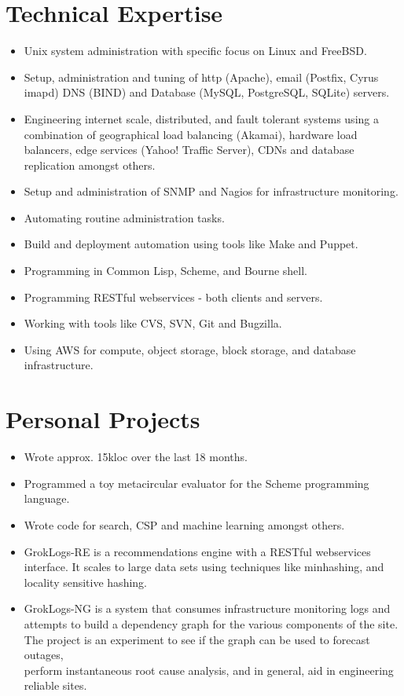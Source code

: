 \documentclass[margin]{res}
\begin{document}
\begin{resume}
\section{Technical Expertise} 
 \begin{itemize} \itemsep -2pt
 \item Unix system administration with specific focus on Linux and FreeBSD.
 \item Setup, administration and tuning of http (Apache), email (Postfix, Cyrus imapd)
   DNS (BIND) and Database (MySQL, PostgreSQL, SQLite) servers.
 \item Engineering internet scale, distributed, and fault tolerant systems 
   using a \\ combination of geographical load balancing (Akamai), hardware load 
   balancers, edge services (Yahoo! Traffic Server), CDNs  and database replication 
   amongst others.
 \item Setup and administration of SNMP and Nagios for infrastructure monitoring.
 \item Automating routine administration tasks.
 \item Build and deployment automation using tools like Make and Puppet.
 \item Programming in Common Lisp, Scheme, and Bourne shell.
 \item Programming RESTful webservices - both clients and servers.
 \item Working with tools like CVS, SVN, Git and Bugzilla.
 \item Using AWS for compute, object storage, block storage, and database \\ 
   infrastructure.

 \end{itemize}

\section{Personal Projects} 
 \begin{itemize} \itemsep -2pt
 \item Wrote approx. 15kloc over the last 18 months.
 \item Programmed a toy metacircular evaluator for the Scheme programming
   language.
 \item Wrote code for search, CSP and machine learning amongst others.
 \item GrokLogs-RE is a recommendations engine with a RESTful webservices 
   interface. It scales to large data sets using techniques like minhashing, 
   and locality sensitive hashing. 
 \item GrokLogs-NG is a system that consumes infrastructure monitoring logs
   and \\ attempts to build a dependency graph for the various components of 
   the site. The project is an experiment to see if the graph can be used
   to forecast outages, \\ perform instantaneous root cause analysis, and in 
   general, aid in engineering reliable sites.


\end{itemize}
\end{resume}
\end{document}
